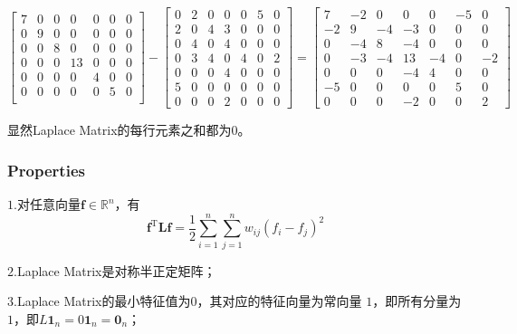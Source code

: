 \documentclass[lang=cn,10pt]{elegantbook}
\newcommand\bv[1]{\boldsymbol{#1}}
\begin{document}
\begin{equation*}
	\begin{bmatrix}
		7 & 0 & 0 & 0  & 0 & 0 & 0 \\
		0 & 9 & 0 & 0  & 0 & 0 & 0 \\
		0 & 0 & 8 & 0  & 0 & 0 & 0 \\
		0 & 0 & 0 & 13 & 0 & 0 & 0 \\
		0 & 0 & 0 & 0  & 4 & 0 & 0 \\
		0 & 0 & 0 & 0  & 0 & 5 & 0 \\
	\end{bmatrix}-
	\begin{bmatrix}
		0 & 2 & 0 & 0 & 0 & 5 & 0 \\
		2 & 0 & 4 & 3 & 0 & 0 & 0 \\
		0 & 4 & 0 & 4 & 0 & 0 & 0 \\
		0 & 3 & 4 & 0 & 4 & 0 & 2 \\
		0 & 0 & 0 & 4 & 0 & 0 & 0 \\
		5 & 0 & 0 & 0 & 0 & 0 & 0 \\
		0 & 0 & 0 & 2 & 0 & 0 & 0
	\end{bmatrix}=
	\begin{bmatrix}
		7  & -2 & 0  & 0  & 0  & -5 & 0  \\
		-2 & 9  & -4 & -3 & 0  & 0  & 0  \\
		0  & -4 & 8  & -4 & 0  & 0  & 0  \\
		0  & -3 & -4 & 13 & -4 & 0  & -2 \\
		0  & 0  & 0  & -4 & 4  & 0  & 0  \\
		-5 & 0  & 0  & 0  & 0  & 5  & 0  \\
		0  & 0  & 0  & -2 & 0  & 0  & 2
	\end{bmatrix}
\end{equation*}
\par 显然Laplace Matrix的每行元素之和都为$0$。
\subsubsection*{Properties}
\textbf{$\mathit{1.}$}对任意向量$\bv{f} \in \mathbb{R}^n$，有
\begin{equation*}
	\mathbf{f}^\mathrm{T}\mathbf{L}\mathbf{f}=\frac12\sum_{i=1}^n\sum_{j=1}^nw_{ij}\left(f_i-f_j\right)^2
\end{equation*}

\textbf{$\mathit{2.}$}Laplace Matrix是对称半正定矩阵；

\textbf{$\mathit{3.}$}Laplace Matrix的最小特征值为$0$，其对应的特征向量为常向量
$1$，即所有分量为$1$，即$L\bv{1}_n = 0\bv{1}_n = \bv{0}_n$；
\end{document}
